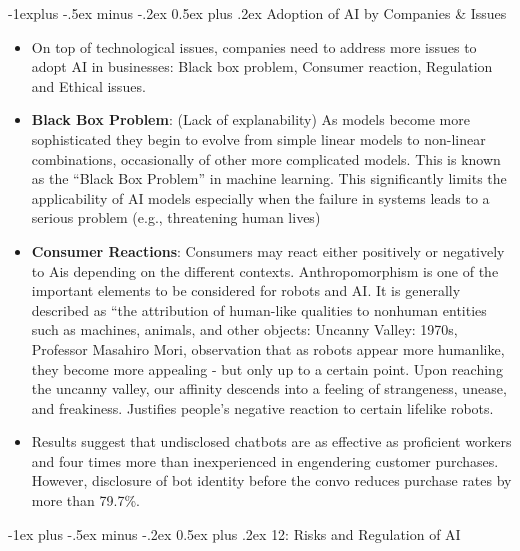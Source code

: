 \documentclass[12pt, landscape]{article}
\makeatletter
\renewcommand{\section}{\@startsection{section}{1}{0mm}%
                                {-1ex plus -.5ex minus -.2ex}%
                                {0.5ex plus .2ex}%
                                {\normalfont\large\bfseries}}
\renewcommand{\subsection}{\@startsection{subsection}{2}{0mm}%
                                {-1explus -.5ex minus -.2ex}%
                                {0.5ex plus .2ex}%
                                {\normalfont\normalsize\bfseries}}
\makeatother
\begin{document}
\begin{multicols*}{3}
\subsection{Adoption of AI by Companies \& Issues}
\begin{itemize}
\item On top of technological issues, companies need to address more issues to adopt AI in businesses: Black box problem, Consumer reaction, Regulation and Ethical issues.
\item \textbf{Black Box Problem}: (Lack of explanability) As models become more sophisticated they begin to evolve from simple linear models to non-linear combinations, occasionally of other more complicated models. This is known as the “Black Box Problem” in machine learning. This significantly limits the applicability of AI models especially when the failure in systems leads to a serious problem (e.g., threatening human lives)
\item \textbf{Consumer Reactions}: Consumers may react either positively or negatively to Ais depending on the different contexts. Anthropomorphism is one of the important elements to be considered for robots and AI. It is generally described as “the attribution of human-like qualities to nonhuman entities such as machines, animals, and other objects: Uncanny Valley: 1970s, Professor Masahiro Mori, observation that as robots appear more humanlike, they become more appealing - but only up to a certain point. Upon reaching the uncanny valley, our affinity descends into a feeling of strangeness, unease, and freakiness. Justifies people’s negative reaction to certain lifelike robots.
\item Results suggest that undisclosed chatbots are as effective as proficient workers and four times more than inexperienced in engendering customer purchases. However, disclosure of bot identity before the convo reduces purchase rates by more than 79.7\%.
\end{itemize}

\vfill\null
\columnbreak


\section{12: Risks and Regulation of AI}










\end{multicols*}
\end{document}
